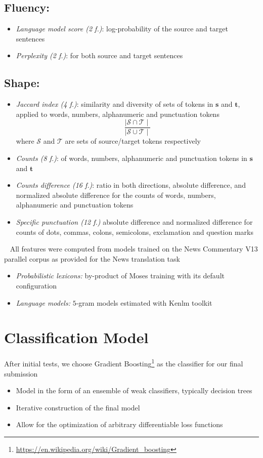 \documentclass[a0]{sciposter}
\begin{document}
\begin{multicols*}{2}
\subsection*{Fluency:} 
\begin{itemize}
  \item \textit{Language model score (2 f.)}: log-probability of the source and target sentences
  \item \textit{Perplexity (2 f.)}: for both source and target sentences
\end{itemize}

\subsection*{Shape:}
\begin{itemize}
  \item \textit{Jaccard index (4 f.)}: similarity and diversity of sets of tokens in $\mathbf{s}$ and $\mathbf{t}$, applied to words, numbers, alphanumeric and punctuation tokens
  $$ \frac{\mid \mathcal{S}\cap \mathcal{T}\mid}{\mid \mathcal{S}\cup \mathcal{T}\mid}$$
  where $\mathcal{S}$ and $\mathcal{T}$ are sets of source/target tokens respectively
  \item \textit{Counts (8 f.)}: of words, numbers, alphanumeric and punctuation tokens in $\mathbf{s}$ and $\mathbf{t}$
  \item \textit{Counts difference (16 f.)}: ratio in both directions, absolute difference, and normalized absolute difference for the counts of words, numbers, alphanumeric and punctuation tokens
  \item \textit{Specific punctuation (12 f.)} absolute difference and normalized difference for counts of dots, commas, colons, semicolons, exclamation and question marks
\end{itemize}

~\newline
All features were computed from models trained on the News Commentary V13 parallel corpus as provided for the News translation task
\begin{itemize}
  \item \textit{Probabilistic lexicons:} by-product of Moses training with its default configuration
  \item \textit{Language models:} $5$-gram models estimated with Kenlm toolkit
\end{itemize}


\section*{\Large Classification Model}
After initial tests, we choose Gradient Boosting\footnote{\url{https://en.wikipedia.org/wiki/Gradient_boosting}} as the classifier for our final submission
\begin{itemize}
  \item Model in the form of an ensemble of weak classifiers, typically decision trees
  \item Iterative construction of the final model
  \item Allow for the optimization of arbitrary differentiable loss functions
\end{itemize}


\end{multicols*}
\end{document}
